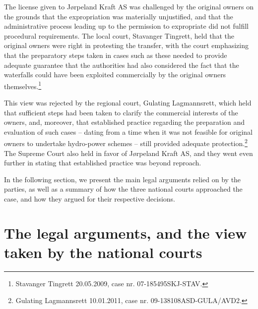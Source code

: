 The license given to Jørpeland Kraft AS was challenged by the original owners on the grounds that the expropriation was materially unjustified, and that the administrative process leading up to the permission to expropriate did not fulfill procedural requirements. The local court, Stavanger Tingrett, held that the original owners were right in protesting the transfer, with the court emphasizing that the preparatory steps taken in cases such as these needed to provide adequate guarantee that the authorities had also considered the fact that the waterfalls could have been exploited commercially by the original owners themselves.\footnote{Stavanger Tingrett 20.05.2009, case nr. 07-185495SKJ-STAV.}

This view was rejected by the regional court, Gulating Lagmannsrett, which held that sufficient steps had been taken to clarify the commercial interests of the owners, and, moreover, that established practice regarding the preparation and evaluation of such cases -- dating from a time when it was not feasible for original owners to undertake hydro-power schemes -- still provided adequate protection.\footnote{Gulating Lagmannsrett 10.01.2011, case nr. 09-138108ASD-GULA/AVD2.} The Supreme Court also held in favor of Jørpeland Kraft AS, and they went even further in stating that established practice was beyond reproach.

In the following section, we present the main legal arguments relied on by the parties, as well as a summary of how the three national courts approached the case, and how they argued for their respective decisions.

\section{The legal arguments, and the view taken by the national courts}\label{view}

